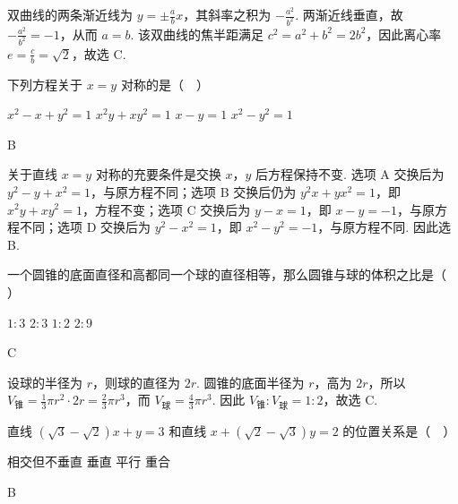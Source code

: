 \begin{solution}
双曲线的两条渐近线为 \(y=\pm\frac{a}{b}x\)，其斜率之积为 \(-\frac{a^2}{b^2}\). 两渐近线垂直，故 \(-\frac{a^2}{b^2}=-1\)，从而 \(a=b\). 该双曲线的焦半距满足 \(c^2=a^2+b^2=2b^2\)，因此离心率 \(e=\frac{c}{b}=\sqrt{2}\)，故选 C.
\end{solution}

\begin{problem}
下列方程关于 \(x = y\) 对称的是（\(\quad\)）

\choices
    {\(x^{2} - x + y^{2} = 1\)}
    {\(x^{2}y + xy^{2} = 1\)}
    {\(x - y = 1\)}
    {\(x^{2} - y^{2} = 1\)}
\end{problem}

\begin{answer}
B
\end{answer}

\begin{solution}
关于直线 \(x=y\) 对称的充要条件是交换 \(x\)，\(y\) 后方程保持不变. 选项 A 交换后为 \(y^2-y+x^2=1\)，与原方程不同；选项 B 交换后仍为 \(y^2x+yx^2=1\)，即 \(x^2y+xy^2=1\)，方程不变；选项 C 交换后为 \(y-x=1\)，即 \(x-y=-1\)，与原方程不同；选项 D 交换后为 \(y^2-x^2=1\)，即 \(x^2-y^2=-1\)，与原方程不同. 因此选 B.
\end{solution}

\begin{problem}
一个圆锥的底面直径和高都同一个球的直径相等，那么圆锥与球的体积之比是（\(\quad\)）

\choices
    {\(1:3\)}
    {\(2:3\)}
    {\(1:2\)}
    {\(2:9\)}
\end{problem}

\begin{answer}
C
\end{answer}

\begin{solution}
设球的半径为 \(r\)，则球的直径为 \(2r\). 圆锥的底面半径为 \(r\)，高为 \(2r\)，所以 \(V_{\text{锥}}=\frac13\pi r^2\cdot2r=\frac23\pi r^3\)，而 \(V_{\text{球}}=\frac43\pi r^3\). 因此 \(V_{\text{锥}}:V_{\text{球}}=1:2\)，故选 C.
\end{solution}

\begin{problem}
直线 \((\sqrt{3} - \sqrt{2})x + y = 3\) 和直线 \(x + (\sqrt{2} - \sqrt{3})y = 2\) 的位置关系是（\(\quad\)）

\choices
    {相交但不垂直}
    {垂直}
    {平行}
    {重合}
\end{problem}

\begin{answer}
B
\end{answer}

